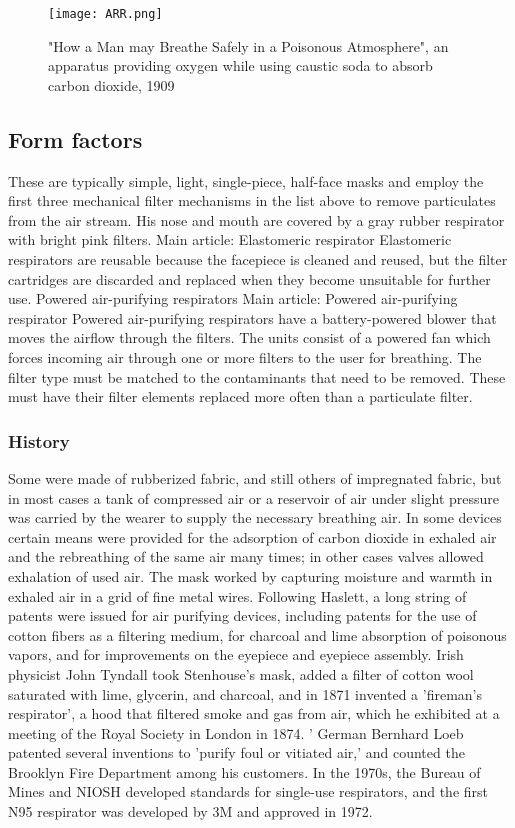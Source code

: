 \documentclass[12pt]{article}
\begin{document}
\begin{figure}[h]
\centering
\texttt{[image: ARR.png]}
\caption{"How a Man may Breathe Safely in a Poisonous Atmosphere", an apparatus providing oxygen while using caustic soda to absorb carbon dioxide, 1909}
\label{fig_ARR}
\end{figure}
\subsection{Form factors}
These are typically simple, light, single-piece, half-face masks and employ the first three mechanical filter mechanisms in the list above to remove particulates from the air stream.
His nose and mouth are covered by a gray rubber respirator with bright pink filters.
Main article: Elastomeric respirator Elastomeric respirators are reusable because the facepiece is cleaned and reused, but the filter cartridges are discarded and replaced when they become unsuitable for further use.
Powered air-purifying respirators Main article: Powered air-purifying respirator Powered air-purifying respirators have a battery-powered blower that moves the airflow through the filters.
The units consist of a powered fan which forces incoming air through one or more filters to the user for breathing.
The filter type must be matched to the contaminants that need to be removed.
These must have their filter elements replaced more often than a particulate filter.

\subsubsection{History}
Some were made of rubberized fabric, and still others of impregnated fabric, but in most cases a tank of compressed air or a reservoir of air under slight pressure was carried by the wearer to supply the necessary breathing air.
In some devices certain means were provided for the adsorption of carbon dioxide in exhaled air and the rebreathing of the same air many times; in other cases valves allowed exhalation of used air.
The mask worked by capturing moisture and warmth in exhaled air in a grid of fine metal wires.
Following Haslett, a long string of patents were issued for air purifying devices, including patents for the use of cotton fibers as a filtering medium, for charcoal and lime absorption of poisonous vapors, and for improvements on the eyepiece and eyepiece assembly.
Irish physicist John Tyndall took Stenhouse's mask, added a filter of cotton wool saturated with lime, glycerin, and charcoal, and in 1871 invented a 'fireman's respirator', a hood that filtered smoke and gas from air, which he exhibited at a meeting of the Royal Society in London in 1874.
' German Bernhard Loeb patented several inventions to 'purify foul or vitiated air,' and counted the Brooklyn Fire Department among his customers.
In the 1970s, the Bureau of Mines and NIOSH developed standards for single-use respirators, and the first N95 respirator was developed by 3M and approved in 1972.
\clearpage
\end{document}
